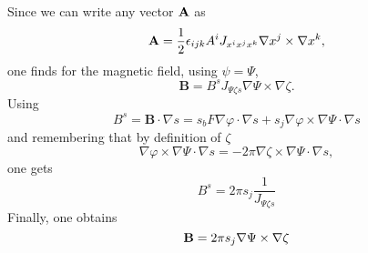 Since we can write any vector ${\bf A}$ as 
\begin{equation} 
{\bf A} = \frac{1}{2}\epsilon_{ijk} A^i J_{x^i x^j x^k} \nabla x^j \times \nabla x^k, 
\end{equation}
one finds for the magnetic field, using $\psi = \Psi$, 
\begin{equation} 
\mathbf{B} = B^s J_{\Psi \zeta s} \nabla \Psi \times \nabla \zeta.
\end{equation}
Using 
\begin{equation}
B^s = \mathbf{B}\cdot\nabla s = s_b F \nabla \varphi \cdot \nabla s + s_j \nabla \varphi \times \nabla \Psi \cdot \nabla s
\end{equation}
and remembering that by definition of $\zeta$
\begin{equation}
\nabla \varphi \times \nabla \Psi \cdot \nabla s = -2\pi \nabla \zeta \times \nabla \Psi \cdot \nabla s,
\end{equation}
one gets
\begin{equation} 
 B^s = 2\pi s_j \frac{1}{J_{\Psi \zeta s}} 
\end{equation}
%
Finally, one obtains  
\begin{equation} 
{\bf B} = 2 \pi s_j \nabla \Psi \times \nabla \zeta 
\label{clebsch}
\end{equation}

